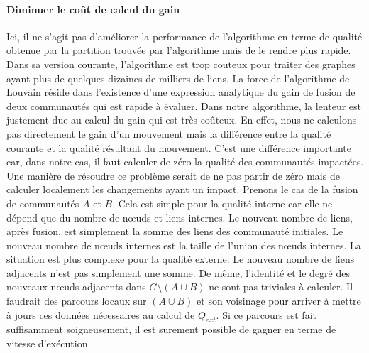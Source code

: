 \paragraph{Diminuer le coût de calcul du gain}
Ici, il ne s'agit pas d'améliorer la performance de l'algorithme en terme de qualité obtenue par la partition trouvée par l'algorithme mais de le rendre plus rapide.
Dans sa version courante, l'algorithme est trop couteux pour traiter des graphes ayant plus de quelques dizaines de milliers de liens.
La force de l'algorithme de Louvain réside dans l'existence d'une expression analytique du gain de fusion de deux communautés qui est rapide à évaluer.
Dans notre algorithme, la lenteur est justement due au calcul du gain qui est très coûteux.
En effet, nous ne calculons pas directement le gain d'un mouvement mais la différence entre la qualité courante et la qualité résultant du mouvement.
C'est une différence importante car, dans notre cas, il faut calculer de zéro la qualité des communautés impactées.
Une manière de résoudre ce problème serait de ne pas partir de zéro mais de calculer localement les changements ayant un impact.
Prenons le cas de la fusion de communautés $A$ et $B$.
Cela est simple pour la qualité interne car elle ne dépend que du nombre de n\oe uds et liens internes.
Le nouveau nombre de liens, après fusion, est simplement la somme des liens des communauté initiales.
Le nouveau nombre de n\oe uds internes est la taille de l'union des n\oe uds internes.
La situation est plus complexe pour la qualité externe.
Le nouveau nombre de liens adjacents n'est pas simplement une somme.
De même, l'identité et le degré des nouveaux n\oe uds adjacents dans $G \setminus (A \cup B)$ ne sont pas triviales à calculer.
Il faudrait des parcours locaux sur $(A \cup B)$ et son voisinage pour arriver à mettre à jours ces données nécessaires au calcul de $Q_{ext}$. 
Si ce parcours est fait suffisamment soigneusement, il est surement possible de gagner en terme de vitesse d'exécution.



